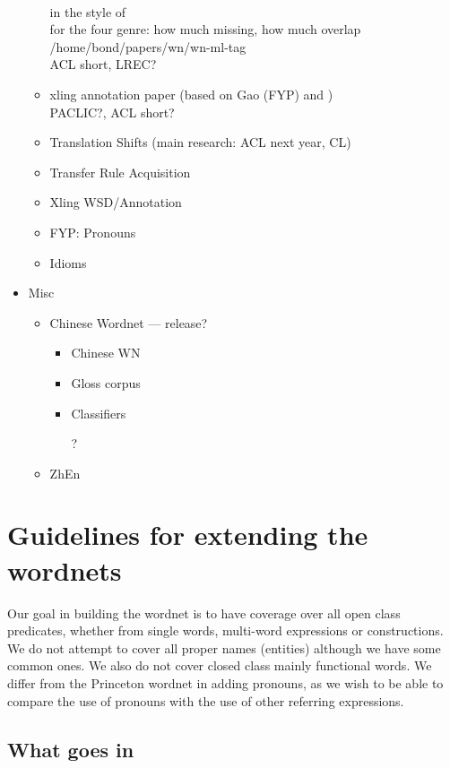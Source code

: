 \documentclass[12pt]{book} %
\begin{document}
\begin{CJK}{UTF8}{gbsn}
\begin{itemize}
\begin{itemize}
    \\ in the style of \citet{Baldwin:Bender:Flickinger:Kim:Oepen:2004}
    \\ for the four genre: how much missing, how much overlap
    \\ /home/bond/papers/wn/wn-ml-tag
    \\ ACL short, LREC?
  \item xling annotation paper (based on Gao (FYP) and \citet{Mok:2012})
    \\ PACLIC?, ACL short?
\item Translation Shifts (main research: ACL next year, CL)
\item Transfer Rule Acquisition
\item Xling WSD/Annotation
\item FYP: Pronouns
\item Idioms
  \end{itemize}
\item Misc
  \begin{itemize}
  \item Chinese Wordnet --- release?
    \begin{itemize}
    \item Chinese WN
    \item Gloss corpus
    \item Classifiers
    \item[?]
    \end{itemize}
  \item ZhEn 
  \end{itemize}

\end{itemize}


\section{Guidelines for extending the wordnets}

Our goal in building the wordnet is to have coverage over all open
class predicates, whether from single words, multi-word expressions or
constructions.  We do not attempt to cover all proper names (entities)
although we have some common ones.  We also do not cover closed class
mainly functional words.  We differ from the Princeton wordnet in
adding pronouns, as we wish to be able to compare the use of pronouns
with the use of other referring expressions.

\subsection{What goes in}


\end{CJK}
\end{document}
